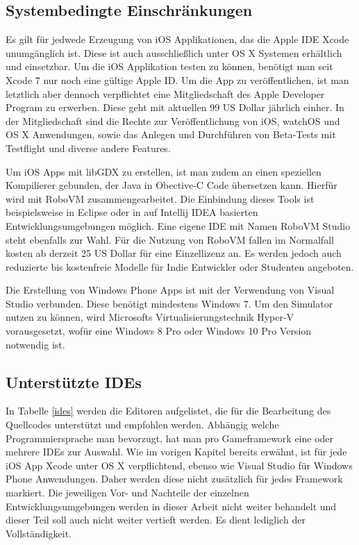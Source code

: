 \subsection{Systembedingte Einschränkungen}
Es gilt für jedwede Erzeugung von iOS Applikationen, das die Apple IDE Xcode unumgänglich ist. Diese ist auch ausschließlich unter OS X Systemen erhältlich und einsetzbar. Um die iOS Applikation testen zu können, benötigt man seit Xcode 7 nur noch eine gültige Apple ID. Um die App zu veröffentlichen, ist man letztlich aber dennoch verpflichtet eine Mitgliedschaft des Apple Developer Program zu erwerben. Diese geht mit aktuellen 99 US Dollar jährlich einher. In der Mitgliedschaft sind die Rechte zur Veröffentlichung von iOS, watchOS und OS X Anwendungen, sowie das Anlegen und Durchführen von Beta-Tests mit Testflight und diverse andere Features. \citep{apple_developer_program}

\bigskip
Um iOS Apps mit libGDX zu erstellen, ist man zudem an einen speziellen Kompilierer gebunden, der Java in Obective-C Code übersetzen kann. Hierfür wird mit RoboVM zusammengearbeitet. Die Einbindung dieses Tools ist beispielsweise in Eclipse oder in auf Intellij IDEA basierten Entwicklungsumgebungen möglich. Eine eigene IDE mit Namen RoboVM Studio steht ebenfalls zur Wahl. Für die Nutzung von RoboVM fallen im Normalfall kosten ab derzeit 25 US Dollar für eine Einzellizenz an. Es werden jedoch auch reduzierte bis kostenfreie Modelle für Indie Entwickler oder Studenten angeboten. \citep{roboVM}

\bigskip
Die Erstellung von Windows Phone Apps ist mit der Verwendung von Visual Studio verbunden. Diese benötigt mindestens Windows 7. Um den Simulator nutzen zu können, wird Microsofts Virtualisierungstechnik Hyper-V vorausgesetzt, wofür eine Windows 8 Pro oder Windows 10 Pro Version notwendig ist. \citep{visual_studio}

\subsection{Unterstützte IDEs}
In Tabelle \ref{ides} werden die Editoren aufgelistet, die für die Bearbeitung des Quellcodes unterstützt und empfohlen werden. Abhängig welche Programmiersprache man bevorzugt, hat man pro Gameframework eine oder mehrere IDEs zur Auswahl. Wie im vorigen Kapitel bereits erwähnt, ist für jede iOS App Xcode unter OS X verpflichtend, ebenso wie Visual Studio für Windows Phone Anwendungen. Daher werden diese nicht zusätzlich für jedes Framework markiert. Die jeweiligen Vor- und Nachteile der einzelnen Entwicklungsumgebungen werden in dieser Arbeit nicht weiter behandelt und dieser Teil soll auch nicht weiter vertieft werden. Es dient lediglich der Vollständigkeit.

